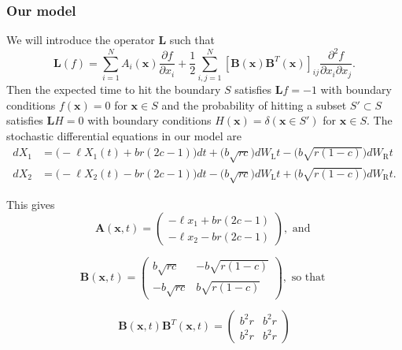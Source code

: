 \documentclass{article}
\newcommand{\mb}{\mathbf}
\begin{document}
\subsubsection{Our model }
We will introduce the operator ${\mb L}$ such that 
\begin{equation}
{\mb L}(f)=\sum_{i=1}^NA_i({\mb x})\frac{\partial f}{\partial x_i}+\frac{1}{2}\sum_{i,j=1}^N[{\mb B}({\mb x}){\mb B}^T({\mb x})]_{ij}\frac{\partial ^2 f}{\partial x_i\partial x_j}. \label{operator}
\end{equation}
Then the expected time to hit the boundary $S$ satisfies ${\mb L}f=-1$ with boundary conditions $f({\mb x})=0$ for ${\mb x}\in S$ and the probability of hitting a subset $S'\subset S$ satisfies ${\mb L}H=0$ with boundary conditions $H({\mb x})=\delta({\mb x}\in S')$ for ${\mb x}\in S$.
The stochastic differential equations in our model are
\begin{equation}
\begin{array}{ll}
dX_1&=\bigg(-\ell X_1(t)+br(2c-1)\bigg)dt+\bigg(b\sqrt{rc}\bigg)dW_\text{L}t-\bigg(b\sqrt{r(1-c)}\bigg)dW_\text{R}t
\\dX_2&=\bigg(-\ell X_2(t)-br(2c-1)\bigg)dt-\bigg(b\sqrt{rc}\bigg)dW_\text{L}t+\bigg(b\sqrt{r(1-c)}\bigg)dW_\text{R}t.
\end{array}
\end{equation}

This gives 
\begin{equation}
{\mb A}({\mb x},t)=\left(\begin{array}{ll} 
-\ell x_1+br(2c-1)
\\ -\ell x_2-br(2c-1)
\end{array}\right), \text{ and }
\end{equation}

\begin{equation}
{\mb B}({\mb x},t)=\left(\begin{array}{ll} 
b\sqrt{rc} & -b\sqrt{r(1-c)}
\\ -b\sqrt{rc} & b\sqrt{r(1-c)}
\end{array}\right), \text{ so that }
\end{equation}

\begin{equation}
{\mb B}({\mb x},t){\mb B}^T({\mb x},t)
=\left(\begin{array}{ll}
b^2r & b^2r
\\ b^2r & b^2r
\end{array}\right)
\end{equation}
\end{document}
